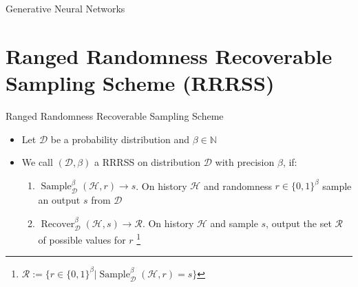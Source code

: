 \documentclass[10pt]{beamer}
\newcommand\blfootnote[1]{%
  \begingroup
  \renewcommand\thefootnote{}\footnote{#1}%
  \addtocounter{footnote}{-1}%
  \endgroup
}
\begin{document}
    \begin{frame}{Generative Neural Networks}
        \centering
    \end{frame}
    
    \section{Ranged Randomness Recoverable Sampling Scheme (RRRSS)}
    
    \begin{frame}{Ranged Randomness Recoverable Sampling Scheme}
        \begin{itemize}[<+- | alert@+>]
            \item Let $\mathcal{D}$ be a probability distribution and $\beta \in \mathbb{N}$
            \item We call $(\mathcal{D}, \beta)$ a RRRSS on distribution $\mathcal{D}$ with precision $\beta$, if:
                \begin{enumerate}
                \item $\operatorname{Sample}^\beta_\mathcal{D}(\mathcal{H}, r) \rightarrow s$. On history $\mathcal{H}$ and randomness $r \in \{0, 1\}^\beta$ sample an output $s$ from $\mathcal{D}$
                \item $\operatorname{Recover}^\beta_\mathcal{D}(\mathcal{H}, s) \rightarrow \mathcal{R}$. On history $\mathcal{H}$ and sample $s$, output the set $\mathcal{R}$ of possible values for $r$\blfootnote{$\mathcal{R} := \{ r \in \{0,1\}^\beta | \operatorname{Sample}^\beta_\mathcal{D}(\mathcal{H}, r) = s\}$}
                \end{enumerate}
        \end{itemize}
    \end{frame}
    
\end{document}
